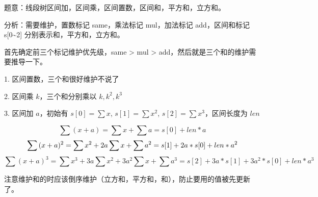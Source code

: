 题意：线段树区间加，区间乘，区间置数，区间和，平方和，立方和。

分析：需要维护，置数标记 same，乘法标记 mul，加法标记 add，区间和标记 s[0\~{}2] 分别表示和，平方和，立方和。

首先确定前三个标记维护优先级，same > mul > add，然后就是三个和的维护需要推导一下。

1. 区间置数，三个和很好维护不说了

2. 区间乘 $k$，三个和分别乘以 $k,k^2,k^3$

3. 区间加 $a$，初始有 $s[0]=\sum{x}$, $s[1]=\sum{x^2}$, $s[2]=\sum{x^3}$，区间长度为 $len$

    \begin {equation} 
    \sum{(x+a)}=\sum{x}+\sum{a}=s[0]+len*a
    \end {equation}
    \begin {equation} 
    \sum{(x+a)^2}=\sum{x^2}+2a\sum{x}+\sum{a^2}=s[1]+2a*s[0]+len*a^2 \\
    \end {equation}
    \begin {equation} 
    \sum{(x+a)^3}=\sum{x^3}+3a\sum{x^2}+3a^2\sum{x}+\sum{a^3}=s[2]+3a*s[1]+3a^2*s[0]+len*a^3 
    \end {equation}

    注意维护和的时应该倒序维护（立方和，平方和，和），防止要用的值被先更新了。